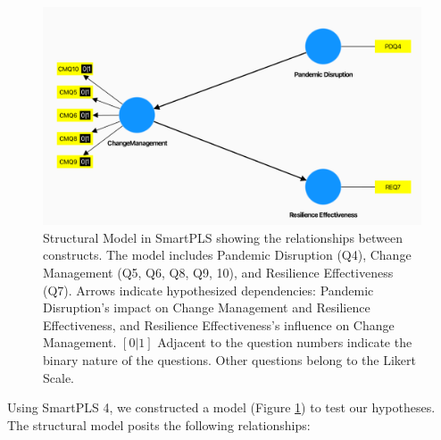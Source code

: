 \begin{figure}[H]
  \centering
  \includegraphics[width=1\textwidth]{figure/initial_model.png}
  \caption{Structural Model in SmartPLS showing the relationships between constructs. The model includes Pandemic Disruption (Q4), Change Management (Q5, Q6, Q8, Q9, 10), and Resilience Effectiveness (Q7). Arrows indicate hypothesized dependencies: Pandemic Disruption's impact on Change Management and Resilience Effectiveness, and Resilience Effectiveness's influence on Change Management. $[0|1]$ Adjacent to the question numbers indicate the binary nature of the questions. Other questions belong to the Likert Scale.}
  \label{fig:constructs}
\end{figure}


\noindent Using SmartPLS 4, we constructed a model (Figure \ref{fig:constructs}) to test our hypotheses. The structural model posits the following relationships:

